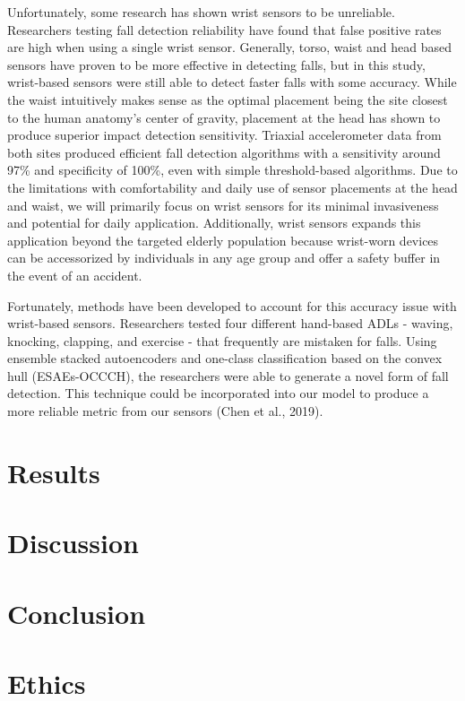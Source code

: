\documentclass{llncs}
\begin{document}
	Unfortunately, some research has shown wrist sensors to be unreliable. Researchers testing fall detection reliability have found that false positive rates are high when using a single wrist sensor.\cite{gjoreski2016accurately} Generally, torso, waist and head based sensors have proven to be more effective in detecting falls, but in this study, wrist-based sensors were still able to detect faster falls with some accuracy. While the waist intuitively makes sense as the optimal placement being the site closest to the human anatomy's center of gravity, placement at the head has shown to produce superior impact detection sensitivity. Triaxial accelerometer data from both sites produced efficient fall detection algorithms with a sensitivity around 97\% and specificity of 100\%, even with simple threshold-based algorithms.\cite{kangas2008comparison} Due to the limitations with comfortability and daily use of sensor placements at the head and waist, we will primarily focus on wrist sensors for its minimal invasiveness and potential for daily application. Additionally, wrist sensors expands this application beyond the targeted elderly population because wrist-worn devices can be accessorized by individuals in any age group and offer a safety buffer in the event of an accident. 

	
	Fortunately, methods have been developed to account for this accuracy issue with wrist-based sensors. Researchers tested four different hand-based ADLs - waving, knocking, clapping, and exercise - that frequently are mistaken for falls. Using ensemble stacked autoencoders and one-class classification based on the convex hull (ESAEs-OCCCH), the researchers were able to generate a novel form of fall detection. This technique could be incorporated into our model to produce a more reliable metric from our sensors (Chen et al., 2019). \cite{chen2019method}
	


\section{Results}
\section{Discussion}
\section{Conclusion}

\section{Ethics}
\end{document}
